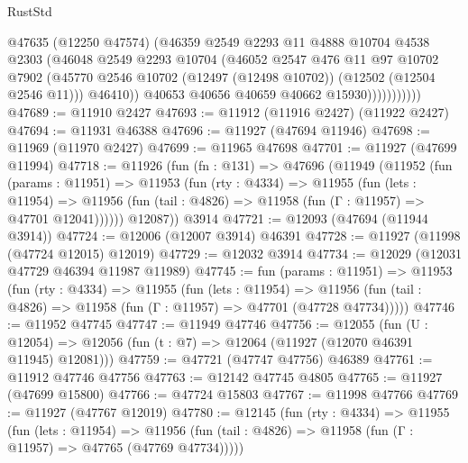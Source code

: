 \begin{lexlean}{RustStd}
\begin{coremodule}
                        @47635
                        (@12250 @47574)
                        (@46359
                          @2549
                          @2293
                          @11
                          @4888
                          @10704
                          @4538
                          @2303
                          (@46048
                            @2549
                            @2293
                            @10704
                            (@46052
                              @2547
                              @476
                              @11
                              @97
                              @10702
                              @7902
                              (@45770
                                @2546
                                @10702
                                (@12497 (@12498 @10702))
                                (@12502 (@12504 @2546 @11)))
                              @46410))
                          @40653
                          @40656
                          @40659
                          @40662
                          @15930)))))))))))
@47689 := @11910 @2427
@47693 := @11912 (@11916 @2427) (@11922 @2427)
@47694 := @11931 @46388
@47696 := @11927 (@47694 @11946)
@47698 := @11969 (@11970 @2427)
@47699 := @11965 @47698
@47701 := @11927 (@47699 @11994)
@47718 := @11926
    (fun (fn : @131) =>
    @47696
      (@11949
        (@11952
          (fun (params : @11951) =>
          @11953
            (fun (rty : @4334) =>
            @11955
              (fun (lets : @11954) =>
              @11956 (fun (tail : @4826) => @11958 (fun (Γ : @11957) => @47701 @12041))))))
        @12087))
    @3914
@47721 := @12093 (@47694 (@11944 @3914))
@47724 := @12006 (@12007 @3914) @46391
@47728 := @11927 (@11998 (@47724 @12015) @12019)
@47729 := @12032 @3914
@47734 := @12029 (@12031 @47729 @46394 @11987 @11989)
@47745 := fun (params : @11951) =>
  @11953
    (fun (rty : @4334) =>
    @11955
      (fun (lets : @11954) =>
      @11956 (fun (tail : @4826) => @11958 (fun (Γ : @11957) => @47701 (@47728 @47734)))))
@47746 := @11952 @47745
@47747 := @11949 @47746
@47756 := @12055
    (fun (U : @12054) => @12056 (fun (t : @7) => @12064 (@11927 (@12070 @46391 @11945) @12081)))
@47759 := @47721 (@47747 @47756) @46389
@47761 := @11912 @47746 @47756
@47763 := @12142 @47745 @4805
@47765 := @11927 (@47699 @15800)
@47766 := @47724 @15803
@47767 := @11998 @47766
@47769 := @11927 (@47767 @12019)
@47780 := @12145
    (fun (rty : @4334) =>
    @11955
      (fun (lets : @11954) =>
      @11956 (fun (tail : @4826) => @11958 (fun (Γ : @11957) => @47765 (@47769 @47734)))))

\end{coremodule}
\end{lexlean}
